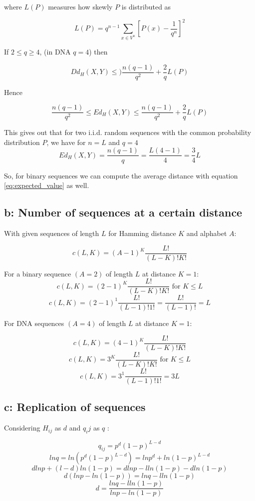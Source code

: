 where $L(P)$ measures how skewly $P$ is distributed as

\[  L(P) = q^{n-1} \sum\limits_{x \in V^n} \left[P(x)-\frac{1}{q^n}\right]^2 \]

If $ 2\leq q \geq 4$, (in DNA $q=4$) then 

\[  Dd_H(X,Y) \leq )\frac{n(q-1)}{q^2} + \frac{2}{q}L(P) \]

Hence

\[  \frac{n(q-1)}{q^2}  \leq Ed_H(X,Y) \leq \frac{n(q-1)}{q^2} + \frac{2}{q}L(P) \]

This gives out that for two i.i.d. random sequences with the common probability distribution $P$, we have for  $n = L$ and $q = 4$
\begin{equation}
Ed_H(X,Y)  = \frac{n(q-1)}{q} = \frac{L(4-1)}{4} = \frac{3}{4}L
\label{eq:expected_value}
\end{equation}

So, for binary sequences we can compute the average distance with equation \ref{eq:expected_value} as well.

\subsection{b: Number of sequences at a certain distance}

With given sequences of length $L$ for Hamming distance $K$ and alphabet $A$:

\[  c(L,K) = (A-1)^K\frac{L!}{(L-K)!K!} \]

For a binary sequence $(A = 2)$ of length $L$ at distance $K = 1$: 
\[  c(L,K) = (2-1)^K\frac{L!}{(L-K)!K!} \text{ for } K\leq L  \]
\[  c(L,K) = (2-1)^1\frac{L!}{(L-1)!1!} = \frac{L!}{(L-1)!}  = L\]

For DNA sequences $(A = 4) $ of length $L$ at distance $K = 1 $:

\[  c(L,K) = (4-1)^K\frac{L!}{(L-K)!K!} \]
\[  c(L,K) = 3^K\frac{L!}{(L-K)!K!} \text{ for } K\leq L \]
\[  c(L,K) = 3^1\frac{L!}{(L-1)!1!} = 3L \]

\subsection{c: Replication of sequences}

Considering $H_{ij}$ as $d$ and $q_ij$ as $q$ : 

\[ q_{ij} = p^d(1-p)^{L-d} \]
\[ ln q = ln (p^d(1-p)^{L-d}) = ln p^d + ln (1-p)^{L-d} \]
\[ d ln p + (l-d) ln (1-p) = d ln p - l ln(1-p) - d ln (1-p)  \]
\[ d(ln p - ln (1-p))  = ln q - l ln (1-p) \]
\[ d = \frac{ln q - l ln (1-p)}{ln p -ln (1-p)}\]


